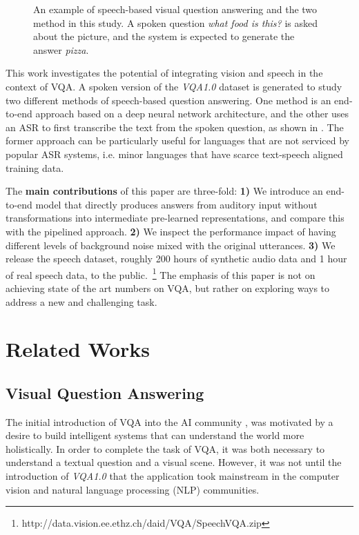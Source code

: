 \documentclass[letterpaper]{article} %
\begin{document}
\begin{figure}[t]
\caption{An example of speech-based visual question answering and the two method in this study. A spoken question \emph{what food is this?} is asked about the picture, and the system is expected to generate the answer \emph{pizza}.}
\label{fig:models}
\end{figure}

This work investigates the potential of integrating vision and speech in the context of VQA. A spoken version of the \textit{VQA1.0} dataset is generated to study two different methods of speech-based question answering. One method is an end-to-end approach based on a deep neural network architecture, and the other uses an ASR to first transcribe the text from the spoken question, as shown in . The former approach can be particularly useful for languages that are not serviced by popular ASR systems, i.e. minor languages that have scarce text-speech aligned training data.

The \textbf{main contributions} of this paper are three-fold: \textbf{1)} We introduce an end-to-end model that directly produces answers from auditory input without transformations into intermediate pre-learned representations, and compare this with the pipelined approach. \textbf{2)} We inspect the performance impact of having different levels of background noise mixed with the original utterances. \textbf{3)} We release the speech dataset, roughly 200 hours of synthetic audio data and 1 hour of real speech data, to the public.~\footnote{http://data.vision.ee.ethz.ch/daid/VQA/SpeechVQA.zip} The emphasis of this paper is not on achieving state of the art numbers on VQA, but rather on exploring ways to address a new and challenging task.


\section{Related Works}

\subsection{Visual Question Answering}
The initial introduction of VQA into the AI community \cite{realtime:vqa}, \cite{daquar} was motivated by a desire to build intelligent systems that can understand the world more holistically. In order to complete the task of VQA, it was both necessary to understand a textual question and a visual scene. However, it was not until the introduction of \textit{VQA1.0} \cite{VQA} that the application took mainstream in the computer vision and natural language processing (NLP) communities.
\end{document}
